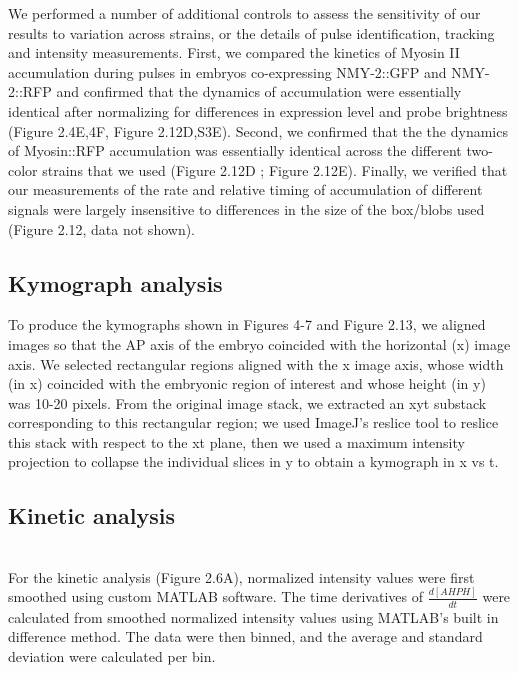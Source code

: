 \documentclass{ucetd}
\begin{document}
{{{{We performed a number of additional controls to assess the sensitivity of our results to variation across strains, or the details of pulse identification, tracking and intensity measurements.  First, we compared the kinetics of Myosin II accumulation during pulses in embryos co-expressing NMY-2::GFP and NMY-2::RFP and confirmed that the dynamics of accumulation were essentially identical after normalizing for differences in expression level and probe brightness (Figure 2.4E,4F, Figure 2.12D,S3E). Second, we confirmed that the the dynamics of Myosin::RFP accumulation was essentially identical across the different two-color strains that we used (Figure 2.12D ; Figure 2.12E). Finally, we verified that our measurements of the rate and relative timing of accumulation of different signals were  largely insensitive to differences in  the size of the box/blobs used (Figure 2.12, data not shown).





\subsection{Kymograph analysis}
To produce the kymographs shown in Figures 4-7 and Figure 2.13, we aligned images so that the AP axis of the embryo coincided with the horizontal (x) image axis.  We selected rectangular regions aligned with the x image axis, whose width (in x) coincided with the embryonic region of interest and whose height (in y) was 10-20 pixels. From the original image stack, we extracted an xyt substack corresponding to this rectangular region; we used ImageJ's reslice tool to reslice this stack with respect to the xt plane, then we used a maximum intensity projection to collapse the individual slices in y to obtain a kymograph  in x vs t.






\subsection{Kinetic analysis}\\
For the kinetic analysis (Figure 2.6A), normalized intensity values were first smoothed using custom MATLAB software. The time derivatives of $\frac{d[AHPH]}{dt}$ were calculated from smoothed normalized intensity values using MATLAB's built in difference method.  The data were then binned, and the average and standard deviation were calculated per bin.

}}}}
\end{document}
